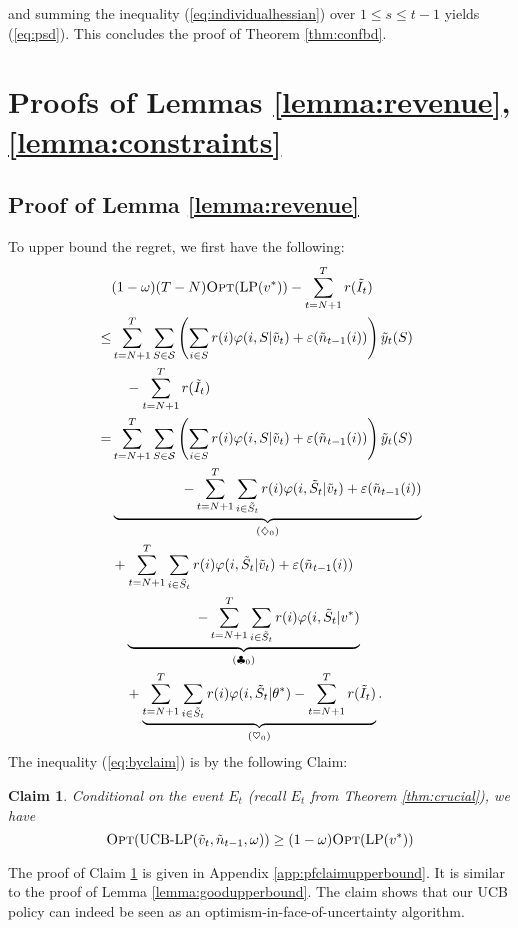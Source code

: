 \documentclass{article}
\newtheorem{claim}[theorem]{Claim}
\theoremstyle{definition}
\newcommand{\SSS}{\mathcal{S}}
\begin{document}
and summing the inequality (\ref{eq:individualhessian}) over $1\leq s\leq t-1$ yields (\ref{eq:psd}). This concludes the proof of Theorem \ref{thm:confbd}.

\section{Proofs of Lemmas \ref{lemma:revenue}, \ref{lemma:constraints}}\label{app:remainingpfs}
\subsection{Proof of Lemma \ref{lemma:revenue}}\label{app:pflemmarevenue}
To upper bound the regret, we first have the following:
\begin{align}
&(1-\omega)(T-N)\text{{\sc Opt}}(\text{LP}(v^*)) - \sum^T_{t=N+1} r(\tilde{I}_t) \nonumber\\
\leq& \sum^{T}_{t = N+1}\sum_{S\in\SSS}\left(\sum_{i\in S} r(i) \varphi(i, S|\tilde{v}_t) + \varepsilon(\tilde{n}_{t-1}(i))\right)\tilde{y}_t(S) \nonumber\\
&\quad -\sum^T_{t=N+1}r(\tilde{I}_t)\label{eq:byclaim}\\
=& \sum^{T}_{t = N+1}\sum_{S\in\SSS}\left(\sum_{i\in S} r(i) \varphi(i, S|\tilde{v}_t) + \varepsilon(\tilde{n}_{t-1}(i))\right)\tilde{y}_t(S)\nonumber\\
&\underbrace{\qquad\qquad \quad - \sum^{T}_{t =N+ 1}\sum_{i\in \tilde{S}_t} r(i) \varphi(i, \tilde{S}_t|\tilde{v}_t) + \varepsilon(\tilde{n}_{t-1}(i))}_{(\diamondsuit_0)}\nonumber\\
\quad & + \sum^{T}_{t = N+1}\sum_{i\in \tilde{S}_t} r(i) \varphi(i, \tilde{S}_t|\tilde{v}_t) + \varepsilon(\tilde{n}_{t-1}(i))\nonumber\\
&\quad\underbrace{\qquad\qquad \quad  - \sum^{T}_{t = N+1}\sum_{i\in \tilde{S}_t} r(i) \varphi(i, \tilde{S}_t|v^*)}_{(\clubsuit_0)} \nonumber\\
\quad & \quad +\underbrace{\sum^{T}_{t = N+1}\sum_{i\in \tilde{S}_t} r(i) \varphi(i, \tilde{S}_t|\theta^*) - \sum^T_{t=N+1}r(\tilde{I}_t)}_{(\heartsuit_0)}.\nonumber 
\end{align}
The inequality (\ref{eq:byclaim}) is by the following Claim:
\begin{claim}\label{claim:upperbound}
Conditional on the event $E_t$ (recall $E_t$ from Theorem \ref{thm:crucial}), we have 
\begin{equation}
\text{{\sc Opt}}(\text{UCB-LP}(\tilde{v}_t, \tilde{n}_{t-1}, \omega)) \geq (1-\omega) \text{{\sc Opt}}(\text{LP}(v^*))
\end{equation}
\end{claim}
The proof of Claim \ref{claim:upperbound} is given in Appendix \ref{app:pfclaimupperbound}. It is similar to the proof of Lemma \ref{lemma:goodupperbound}. The claim shows that our UCB policy can indeed be seen as an optimism-in-face-of-uncertainty algorithm.
\end{document}
